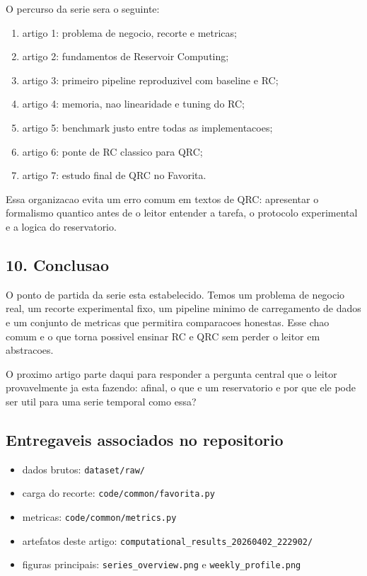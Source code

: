 \documentclass[12pt]{article}
\providecommand{\tightlist}{%
          \setlength{\itemsep}{0pt}\setlength{\parskip}{0pt}}
\begin{document}
O percurso da serie sera o seguinte:

\begin{enumerate}
\def\labelenumi{\arabic{enumi}.}
\tightlist
\item
  artigo 1: problema de negocio, recorte e metricas;
\item
  artigo 2: fundamentos de Reservoir Computing;
\item
  artigo 3: primeiro pipeline reproduzivel com baseline e RC;
\item
  artigo 4: memoria, nao linearidade e tuning do RC;
\item
  artigo 5: benchmark justo entre todas as implementacoes;
\item
  artigo 6: ponte de RC classico para QRC;
\item
  artigo 7: estudo final de QRC no Favorita.
\end{enumerate}

Essa organizacao evita um erro comum em textos de QRC: apresentar o formalismo quantico antes de o leitor entender a tarefa, o protocolo experimental e a logica do reservatorio.

\subsection{10. Conclusao}\label{10-conclusao}

O ponto de partida da serie esta estabelecido. Temos um problema de negocio real, um recorte experimental fixo, um pipeline minimo de carregamento de dados e um conjunto de metricas que permitira comparacoes honestas. Esse chao comum e o que torna possivel ensinar RC e QRC sem perder o leitor em abstracoes.

O proximo artigo parte daqui para responder a pergunta central que o leitor provavelmente ja esta fazendo: afinal, o que e um reservatorio e por que ele pode ser util para uma serie temporal como essa?

\subsection{Entregaveis associados no repositorio}\label{entregaveis-associados-no-repositorio}

\begin{itemize}
\tightlist
\item
  dados brutos: \texttt{dataset/raw/}
\item
  carga do recorte: \texttt{code/common/favorita.py}
\item
  metricas: \texttt{code/common/metrics.py}
\item
  artefatos deste artigo: \texttt{computational\_results\_20260402\_222902/}
\item
  figuras principais: \texttt{series\_overview.png} e \texttt{weekly\_profile.png}
\end{itemize}
\end{document}
